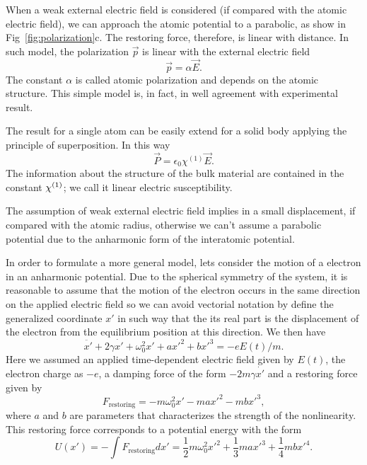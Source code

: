 When a weak external electric field is considered (if compared with the atomic electric field), we can approach the atomic potential to a parabolic, as show in Fig~\ref{fig:polarization}c. The restoring force, therefore, is linear with distance. In such model, the polarization $\vec{p}$ is linear with the external electric field
\begin{equation}
    \vec{p} = \alpha \vec{E}.
\end{equation}
The constant $\alpha$ is called atomic polarization and depends on the atomic structure. This simple model is, in fact, in well agreement with experimental result.  

The result for a single atom can be easily extend for a solid body applying the principle of  superposition. In this way
\begin{equation}
    \vec{P} = \epsilon_0\chi^{(1)}\vec{E}.
\end{equation}
The information about the structure of the bulk material are contained in the constant $\chi^{( 1)}$; we call it linear electric susceptibility.

The assumption of weak external electric field implies in a small displacement, if compared with the atomic radius, otherwise we can't assume a parabolic potential due to the anharmonic form of the interatomic potential. 

In order to formulate a more general model, lets consider the motion of a electron in an anharmonic potential. Due to the spherical symmetry of the system, it is reasonable to assume that the motion of the electron occurs in the same direction on the applied electric field so we can avoid vectorial notation by define the generalized coordinate $x'$ in such way that the its real part is the displacement of the electron from the equilibrium position at this direction. We then have
\begin{equation}
    \ddot{x'} + 2\gamma\dot{x'} + \omega_0^2x'+ax'^2+bx'^3 = -eE(t)/m.
    \label{eq:motion_equation_electron}
\end{equation}
Here we assumed an applied time-dependent electric field given by $E(t)$, the electron charge as $-e$, a damping force of the form $-2m\gamma\dot{x'}$ and a restoring force given by
\begin{equation}
    F_\text{restoring} = -m\omega_0^2x' -max'^2 -mbx'^3, 
\end{equation}
where $a$ and $b$ are parameters that characterizes the strength of the nonlinearity. This restoring force corresponds to a potential energy with the form 
\begin{equation}
    U(x') = -\int F_\text{restoring} dx' = \frac{1}{2}m\omega_0^2x'^2 +\frac{1}{3}max'^3 +\frac{1}{4}mbx'^4.
\end{equation}

